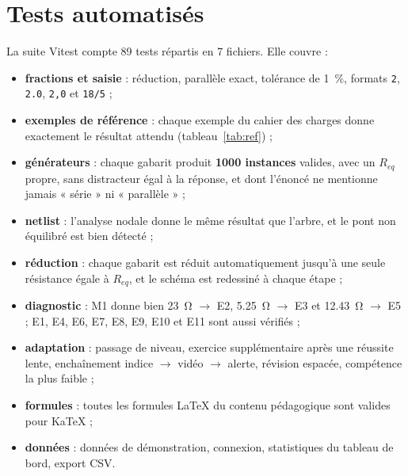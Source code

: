 \documentclass[11pt,a4paper]{report}
\newcommand{\req}{R_{eq}}
\newcommand{\code}[1]{\texttt{#1}}
\begin{document}
\section{Tests automatisés}
La suite Vitest compte 89 tests répartis en 7 fichiers. Elle couvre :
\begin{itemize}
  \item \textbf{fractions et saisie} : réduction, parallèle exact, tolérance de \SI{1}{\percent}, formats \code{2}, \code{2.0}, \code{2,0} et \code{18/5} ;
  \item \textbf{exemples de référence} : chaque exemple du cahier des charges donne exactement le résultat attendu (tableau~\ref{tab:ref}) ;
  \item \textbf{générateurs} : chaque gabarit produit \textbf{1000 instances} valides, avec un $\req$ propre, sans distracteur égal à la réponse, et dont l'énoncé ne mentionne jamais « série » ni « parallèle » ;
  \item \textbf{netlist} : l'analyse nodale donne le même résultat que l'arbre, et le pont non équilibré est bien détecté ;
  \item \textbf{réduction} : chaque gabarit est réduit automatiquement jusqu'à une seule résistance égale à $\req$, et le schéma est redessiné à chaque étape ;
  \item \textbf{diagnostic} : M1 donne bien \SI{23}{\ohm} $\to$ E2, \SI{5.25}{\ohm} $\to$ E3 et \SI{12.43}{\ohm} $\to$ E5 ; E1, E4, E6, E7, E8, E9, E10 et E11 sont aussi vérifiés ;
  \item \textbf{adaptation} : passage de niveau, exercice supplémentaire après une réussite lente, enchaînement indice $\to$ vidéo $\to$ alerte, révision espacée, compétence la plus faible ;
  \item \textbf{formules} : toutes les formules \LaTeX{} du contenu pédagogique sont valides pour KaTeX ;
  \item \textbf{données} : données de démonstration, connexion, statistiques du tableau de bord, export CSV.
\end{itemize}
\end{document}

